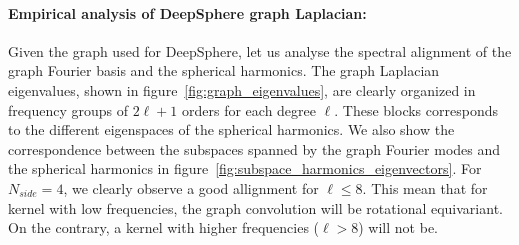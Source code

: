 \documentclass{article} %
\newcommand{\figref}[1]{figure~\ref{fig:#1}}
\renewcommand{\b}[1]{{\bm{#1}}}   %
\newcommand{\1}{\b{1}}              %
\newcommand{\0}{\b{0}}              %
\renewcommand{\L}{\b{L}}
\newcommand{\U}{\b{U}}
\begin{document}


\paragraph{Empirical analysis of DeepSphere graph Laplacian:}
Given the graph used for DeepSphere, let us analyse the spectral alignment of the graph Fourier basis and the spherical harmonics.
The graph Laplacian eigenvalues, shown in \figref{graph_eigenvalues}, are clearly organized in frequency groups of $2\ell + 1$ orders for each degree $\ell$.
These blocks corresponds to the different eigenspaces of the spherical harmonics.
We also show the correspondence between the subspaces spanned by the graph Fourier modes and the spherical harmonics in \figref{subspace_harmonics_eigenvectors}.
For $N_{side}=4$, we clearly observe a good allignment for $\ell\leq 8$. This mean that for kernel with low frequencies, the graph convolution will be rotational equivariant. On the contrary, a kernel with higher frequencies ($\ell>8$) will not be.
\end{document}
